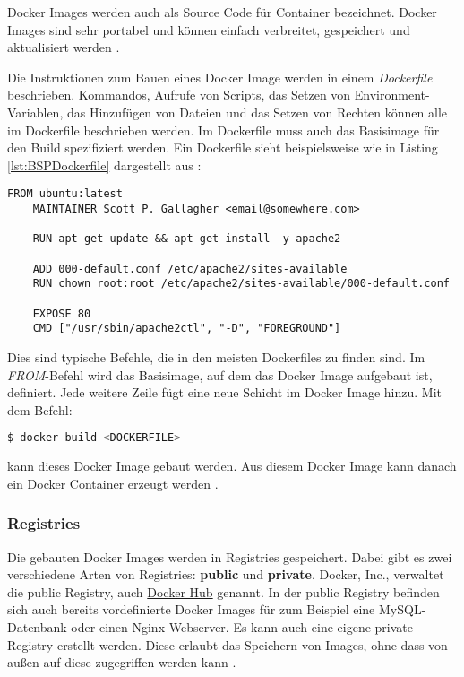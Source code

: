 Docker Images werden auch als \glqq Source Code\grqq{} für Container bezeichnet. Docker Images sind sehr portabel und können einfach verbreitet, gespeichert und aktualisiert werden \cite{TheDockerBook}. 

Die Instruktionen zum Bauen eines Docker Image werden in einem \textit{Dockerfile} beschrieben. Kommandos, Aufrufe von Scripts, das Setzen von Environment-Variablen, das Hinzufügen von Dateien und das Setzen von Rechten können alle im Dockerfile beschrieben werden. Im Dockerfile muss auch das Basisimage für den Build spezifiziert werden. Ein Dockerfile sieht beispielsweise wie in Listing \ref{lst:BSPDockerfile} dargestellt aus \cite{MasteringDocker}:

\begin{lstlisting}[language=docker, caption=Beispiel für ein Dockerfile, label={lst:BSPDockerfile}]
	FROM ubuntu:latest
	MAINTAINER Scott P. Gallagher <email@somewhere.com>
	
	RUN apt-get update && apt-get install -y apache2
	
	ADD 000-default.conf /etc/apache2/sites-available
	RUN chown root:root /etc/apache2/sites-available/000-default.conf
	
	EXPOSE 80
	CMD ["/usr/sbin/apache2ctl", "-D", "FOREGROUND"]
\end{lstlisting}

Dies sind typische Befehle, die in den meisten Dockerfiles zu finden sind. Im \textit{FROM}-Befehl wird das Basisimage, auf dem das Docker Image aufgebaut ist, definiert. Jede weitere Zeile fügt eine neue  Schicht im Docker Image hinzu. Mit dem Befehl:
\begin{lstlisting}[language=bash]
$ docker build <DOCKERFILE>
\end{lstlisting}
kann dieses Docker Image gebaut werden. Aus diesem Docker Image kann danach ein Docker Container erzeugt werden \cite{MasteringDocker}.

\subsubsection{Registries}
Die gebauten Docker Images werden in Registries gespeichert. Dabei gibt es zwei verschiedene Arten von Registries: \textbf{public} und \textbf{private}. Docker, Inc., verwaltet die public Registry, auch \href{https://hub.docker.com/}{Docker Hub} genannt. In der public Registry befinden sich auch bereits vordefinierte Docker Images für zum Beispiel eine MySQL-Datenbank oder einen Nginx Webserver.
Es kann auch eine eigene private Registry erstellt werden. Diese erlaubt das Speichern von Images, ohne dass von außen auf diese zugegriffen werden kann \cite{TheDockerBook}.

